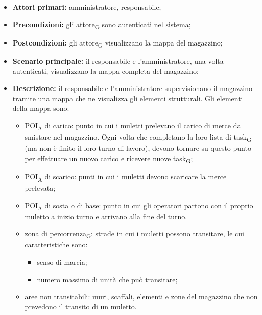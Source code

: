 \begin{itemize}
	\item 	\textbf{Attori primari:} amministratore, responsabile;
	\item 	\textbf{Precondizioni:} gli attore\textsubscript{G} sono autenticati nel sistema;
	\item 	\textbf{Postcondizioni:} gli attore\textsubscript{G} visualizzano la mappa del magazzino;
	\item 	\textbf{Scenario principale:} il responsabile e l'amministratore, una volta autenticati, visualizzano la mappa completa del magazzino;
	\item 	\textbf{Descrizione:} il responsabile e l'amministratore supervisionano il magazzino tramite una mappa che ne visualizza gli elementi strutturali. Gli elementi della mappa sono:
	\begin{itemize}
		\item POI\textsubscript{A} di carico:  punto in cui i muletti prelevano il carico di merce da smistare nel magazzino. Ogni volta che completano la loro lista di task\textsubscript{G} (ma non è finito il loro turno di lavoro), devono tornare su questo punto per effettuare un nuovo carico e ricevere nuove task\textsubscript{G};
		\item POI\textsubscript{A} di scarico: punti in cui i muletti devono scaricare la merce prelevata;
		\item POI\textsubscript{A} di sosta o di base: punto in cui gli operatori partono con il proprio muletto a inizio turno e arrivano alla fine del turno.
		\item zona di percorrenza\textsubscript{G}: strade in cui i muletti possono transitare, le cui caratteristiche sono:
		\begin{itemize}
			\item senso di marcia;
			\item numero massimo di unità che può transitare;
		\end{itemize}
		\item aree non transitabili: muri, scaffali, elementi e zone del magazzino che non prevedono il transito di un muletto.
	\end{itemize}

\end{itemize}


